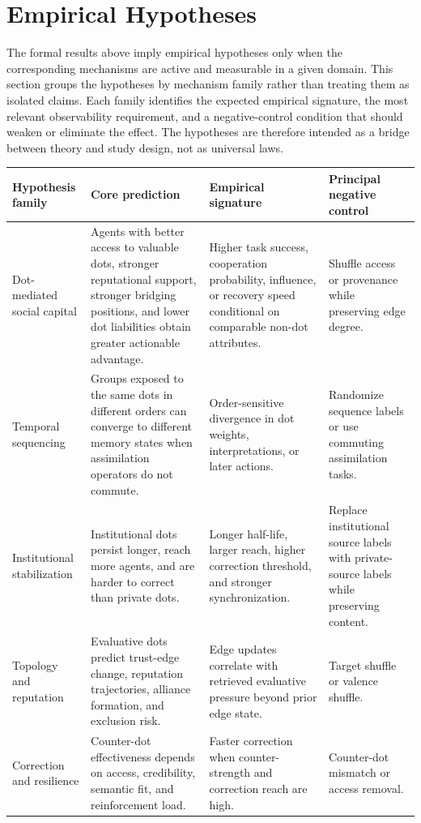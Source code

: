 \documentclass[11pt]{article}
\theoremstyle{remark}
\begin{document}
\section{Empirical Hypotheses}\label{research-hypotheses}

The formal results above imply empirical hypotheses only when the corresponding mechanisms are active and measurable in a given domain. This section groups the hypotheses by mechanism family rather than treating them as isolated claims. Each family identifies the expected empirical signature, the most relevant observability requirement, and a negative-control condition that should weaken or eliminate the effect. The hypotheses are therefore intended as a bridge between theory and study design, not as universal laws.

\begin{longtable}[]{@{}L{0.20\textwidth}L{0.33\textwidth}L{0.27\textwidth}L{0.15\textwidth}@{}}
\toprule
Hypothesis family & Core prediction & Empirical signature & Principal negative control\\
\midrule
\endhead
Dot-mediated social capital & Agents with better access to valuable dots, stronger reputational support, stronger bridging positions, and lower dot liabilities obtain greater actionable advantage. & Higher task success, cooperation probability, influence, or recovery speed conditional on comparable non-dot attributes. & Shuffle access or provenance while preserving edge degree.\\
Temporal sequencing & Groups exposed to the same dots in different orders can converge to different memory states when assimilation operators do not commute. & Order-sensitive divergence in dot weights, interpretations, or later actions. & Randomize sequence labels or use commuting assimilation tasks.\\
Institutional stabilization & Institutional dots persist longer, reach more agents, and are harder to correct than private dots. & Longer half-life, larger reach, higher correction threshold, and stronger synchronization. & Replace institutional source labels with private-source labels while preserving content.\\
Topology and reputation & Evaluative dots predict trust-edge change, reputation trajectories, alliance formation, and exclusion risk. & Edge updates correlate with retrieved evaluative pressure beyond prior edge state. & Target shuffle or valence shuffle.\\
Correction and resilience & Counter-dot effectiveness depends on access, credibility, semantic fit, and reinforcement load. & Faster correction when counter-strength and correction reach are high. & Counter-dot mismatch or access removal.\\

\end{longtable}
\end{document}
